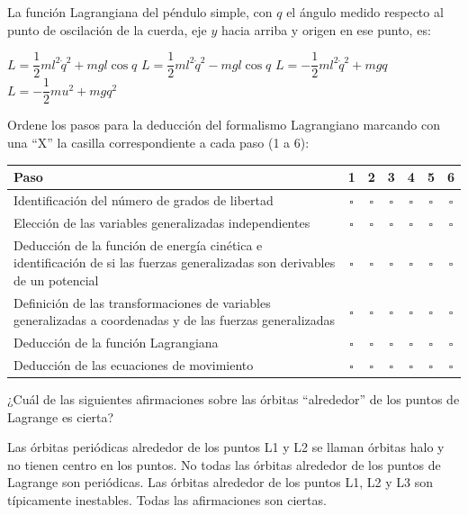 \documentclass[12pt,addpoints]{exam}
\begin{document}
\begin{questions}
\question La función Lagrangiana del péndulo simple, con $q$ el ángulo medido respecto al punto de oscilación de la cuerda, eje $y$ hacia arriba y origen en ese punto, es:
\begin{choices}
\choice $L = \dfrac{1}{2} m l^2 \dot{q}^2 + m g l \cos q$
\choice $L = \dfrac{1}{2} m l^2 \dot{q}^2 - m g l \cos q$
\choice $L = -\dfrac{1}{2} m l^2 \dot{q}^2 + m g q$
\choice $L = -\dfrac{1}{2} m u^2 + m g q^2$
\end{choices}

\question Ordene los pasos para la deducción del formalismo Lagrangiano marcando con una ``X'' la casilla correspondiente a cada paso (1 a 6):
\begin{center}
\begin{tabular}{p{} c c c c c c}
\toprule
\textbf{Paso} & \textbf{1} & \textbf{2} & \textbf{3} & \textbf{4} & \textbf{5} & \textbf{6} \\
\midrule
Identificación del número de grados de libertad & $\square$ & $\square$ & $\square$ & $\square$ & $\square$ & $\square$ \\
Elección de las variables generalizadas independientes & $\square$ & $\square$ & $\square$ & $\square$ & $\square$ & $\square$ \\
Deducción de la función de energía cinética e identificación de si las fuerzas generalizadas son derivables de un potencial & $\square$ & $\square$ & $\square$ & $\square$ & $\square$ & $\square$ \\
Definición de las transformaciones de variables generalizadas a coordenadas y de las fuerzas generalizadas & $\square$ & $\square$ & $\square$ & $\square$ & $\square$ & $\square$ \\
Deducción de la función Lagrangiana & $\square$ & $\square$ & $\square$ & $\square$ & $\square$ & $\square$ \\
Deducción de las ecuaciones de movimiento & $\square$ & $\square$ & $\square$ & $\square$ & $\square$ & $\square$ \\
\bottomrule
\end{tabular}
\end{center}

\question ¿Cuál de las siguientes afirmaciones sobre las órbitas ``alrededor'' de los puntos de Lagrange es cierta?
\begin{choices}
\choice Las órbitas periódicas alrededor de los puntos L1 y L2 se llaman órbitas halo y no tienen centro en los puntos.
\choice No todas las órbitas alrededor de los puntos de Lagrange son periódicas.
\choice Las órbitas alrededor de los puntos L1, L2 y L3 son típicamente inestables.
\choice Todas las afirmaciones son ciertas.
\end{choices}


\end{questions}
\end{document}
